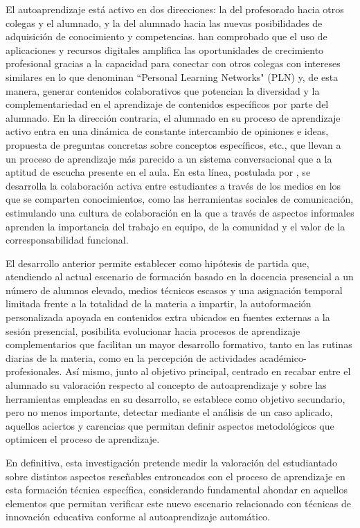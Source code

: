 \documentclass[spanish]{textolivre}
\begin{document}
El autoaprendizaje está activo en dos direcciones: la del profesorado hacia otros colegas y el alumnado, y la del alumnado hacia las nuevas posibilidades de adquisición de conocimiento y competencias. \textcite{alcala_del_olmo_fernandez_competencias_2020} han comprobado que el uso de aplicaciones y recursos digitales amplifica las oportunidades de crecimiento profesional gracias a la capacidad para conectar con otros colegas con intereses similares en lo que denominan “Personal Learning Networks" (PLN) y, de esta manera, generar contenidos colaborativos que potencian la diversidad y la complementariedad en el aprendizaje de contenidos específicos por parte del alumnado. En la dirección contraria, el alumnado en su proceso de aprendizaje activo entra en una dinámica de constante intercambio de opiniones e ideas, propuesta de preguntas concretas sobre conceptos específicos, etc., que llevan a un proceso de aprendizaje más parecido a un sistema conversacional que a la aptitud de escucha presente en el aula. En esta línea, postulada por \textcite{prestridge_categorising_2019}, se desarrolla la colaboración activa entre estudiantes a través de los medios en los que se comparten conocimientos, como las herramientas sociales de comunicación, estimulando una cultura de colaboración en la que a través de aspectos informales aprenden la importancia del trabajo en equipo, de la comunidad y el valor de la corresponsabilidad funcional. 

El desarrollo anterior permite establecer como hipótesis de partida que, atendiendo al actual escenario de formación basado en la docencia presencial a un número de alumnos elevado, medios técnicos escasos y una asignación temporal limitada frente a la totalidad de la materia a impartir, la autoformación personalizada apoyada en contenidos extra ubicados en fuentes externas a la sesión presencial, posibilita evolucionar hacia procesos de aprendizaje complementarios que facilitan un mayor desarrollo formativo, tanto en las rutinas diarias de la materia, como en la percepción de actividades académico-profesionales. Así mismo, junto al objetivo principal, centrado en recabar entre el alumnado su valoración respecto al concepto de autoaprendizaje y sobre las herramientas empleadas en su desarrollo, se establece como objetivo secundario, pero no menos importante, detectar mediante el análisis de un caso aplicado, aquellos aciertos y carencias que permitan definir aspectos metodológicos que optimicen el proceso de aprendizaje.

En definitiva, esta investigación pretende medir la valoración del estudiantado sobre distintos aspectos reseñables entroncados con el proceso de aprendizaje en esta formación técnica específica, considerando fundamental ahondar en aquellos elementos que permitan verificar este nuevo escenario relacionado con técnicas de innovación educativa conforme al autoaprendizaje automático. 
\end{document}
